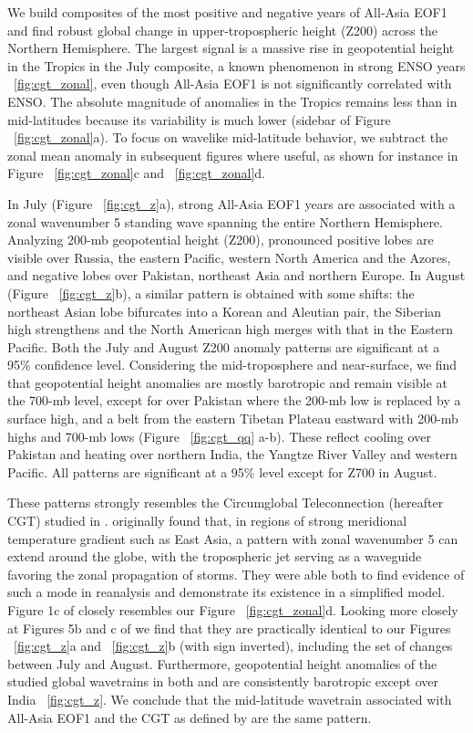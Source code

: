 	We build composites of the most positive and negative years of All-Asia EOF1 and find robust global change in upper-tropospheric height (Z200) across the Northern Hemisphere. The largest signal is a massive rise in geopotential height in the Tropics in the July composite, a known phenomenon in strong ENSO years ~\ref{fig:cgt_zonal}, even though All-Asia EOF1 is not significantly correlated with ENSO. The absolute magnitude of anomalies in the Tropics remains less than in mid-latitudes because its variability is much lower (sidebar of Figure ~\ref{fig:cgt_zonal}a). To focus on wavelike mid-latitude behavior, we subtract the zonal mean anomaly in subsequent figures where useful, as shown for instance in Figure ~\ref{fig:cgt_zonal}c and ~\ref{fig:cgt_zonal}d.
	
	In July (Figure ~\ref{fig:cgt_z}a), strong All-Asia EOF1 years are associated with a zonal wavenumber 5 standing wave spanning the entire Northern Hemisphere. Analyzing 200-mb geopotential height (Z200),  pronounced positive lobes are visible over Russia, the eastern Pacific, western North America and the Azores, and negative lobes over Pakistan, northeast Asia and northern Europe. In August (Figure ~\ref{fig:cgt_z}b), a similar pattern is obtained with some shifts: the northeast Asian lobe bifurcates into a Korean and Aleutian pair, the Siberian high strengthens and the North American high merges with that in the Eastern Pacific. Both the July and August Z200 anomaly patterns are significant at a 95\% confidence level. Considering the mid-troposphere and near-surface, we find that geopotential height anomalies are mostly barotropic and remain visible at the 700-mb level, except for over Pakistan where the 200-mb low is replaced by a surface high, and a belt from the eastern Tibetan Plateau eastward with 200-mb highs and 700-mb lows (Figure ~\ref{fig:cgt_qq} a-b). These reflect cooling over Pakistan and heating over northern India, the Yangtze River Valley and western Pacific. All patterns are significant at a 95\% level except for Z700 in August.
	
	These patterns strongly resembles the Circumglobal Teleconnection (hereafter CGT) studied in \citet{Ding2005a}. \citet{Branstator2002} originally found that, in regions of strong meridional temperature gradient such as East Asia, a pattern with zonal wavenumber 5 can extend around the globe, with the tropospheric jet serving as a waveguide favoring the zonal propagation of storms. They were able both to find evidence of such a mode in reanalysis and demonstrate its existence in a simplified model. Figure 1c of \citet{Branstator2002} closely resembles our Figure ~\ref{fig:cgt_zonal}d. Looking more closely at Figures 5b and c of \citet{Ding2005a} we find that they are practically identical to our Figures ~\ref{fig:cgt_z}a and ~\ref{fig:cgt_z}b (with sign inverted), including the set of changes between July and August. Furthermore, geopotential height anomalies of the studied global wavetrains in both \citet{Branstator2002} and \citet{Ding2005a} are consistently barotropic except over India ~\ref{fig:cgt_z}. We conclude that the mid-latitude wavetrain associated with All-Asia EOF1 and the CGT as defined by \citet{Ding2005a} are the same pattern.
	
